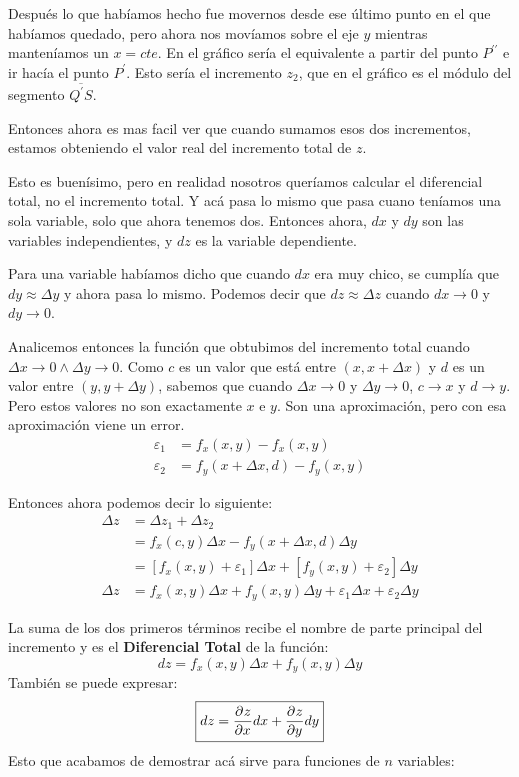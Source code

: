 \documentclass[12pt]{article}
\begin{document}
Después lo que habíamos hecho fue movernos desde ese último punto en el que habíamos quedado, pero ahora nos movíamos sobre el eje $ y $ mientras manteníamos un $ x = cte $. En el gráfico sería el equivalente a partir del punto $ P^{\prime\prime} $ e ir hacía el punto $ P^{\prime} $. Esto sería el incremento $ z_{2} $, que en el gráfico es el módulo del segmento $ \overline{Q^{\prime}S} $.

Entonces ahora es mas facil ver que cuando sumamos esos dos incrementos, estamos obteniendo el valor real del incremento total de $ z $.

Esto es buenísimo, pero en realidad nosotros queríamos calcular el diferencial total, no el incremento total. Y acá pasa lo mismo que pasa cuano teníamos una sola variable, solo que ahora tenemos dos. Entonces ahora, $ dx $ y $ dy $ son las variables independientes, y $ dz $ es la variable dependiente.

Para una variable habíamos dicho que cuando $ dx $ era muy chico, se cumplía que $ dy \approx \Delta y $ y ahora pasa lo mismo. Podemos decir que $ dz \approx \Delta z $ cuando $ dx \to 0 $ y $ dy \to 0 $.

Analicemos entonces la función que obtubimos del incremento total cuando $ \Delta x \to 0 \land \Delta y \to 0 $.
Como $ c $ es un valor que está entre $ (x, x + \Delta x) $ y $ d $ es un valor entre $ (y, y + \Delta y) $, sabemos que cuando $ \Delta x \to 0 $ y $ \Delta y \to 0 $, $ c \to x $ y $ d \to y $. Pero estos valores no son exactamente $ x $ e $ y $. Son una aproximación, pero con esa aproximación viene un error. 
\begin{align*}
  \varepsilon_{1} &= f_{x}(x,y) - f_{x}(x,y)\\
  \varepsilon_{2} &= f_{y}(x + \Delta x, d) - f_{y}(x,y)
\end{align*}

Entonces ahora podemos decir lo siguiente:
\begin{align*}
  \Delta z &= \Delta z_{1} + \Delta z_{2} \\
   &= f_{x}(c,y)\Delta x - f_{y}(x + \Delta x, d)\Delta y \\
    &= \left[f_{x}(x,y) + \varepsilon_{1}\right]\Delta x + \left[f_{y}(x,y) + \varepsilon_{2}\right]\Delta y \\
    \Delta z &= f_{x}(x,y)\Delta x + f_{y}(x,y)\Delta y + \varepsilon_{1}\Delta x + \varepsilon_{2}\Delta y
\end{align*}

La suma de los dos primeros términos recibe el nombre de parte principal del incremento y es el \textbf{Diferencial Total} de la función:
\[
\boxed{dz = f_{x}(x,y)\Delta x + f_{y}(x,y)\Delta y}
\]
También se puede expresar:
\[
\boxed{dz = \pdv[]{z}{x}dx + \pdv[]{z}{y}dy}
\]
Esto que acabamos de demostrar acá sirve para funciones de $ n $ variables:
\end{document}
